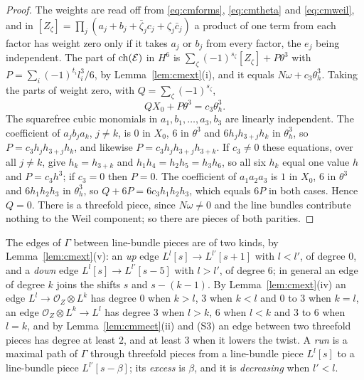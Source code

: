 \begin{proof}
The weights are read off from \eqref{eq:cmforms}, \eqref{eq:cmtheta} and \eqref{eq:cmweil}, and in $[Z_{\zeta}]=\prod_{j}(a_{j}+b_{j}+\bar\zeta_{j}c_{j}+\zeta_{j}\bar c_{j})$ a product of one term from each factor has weight zero only if it takes $a_{j}$ or $b_{j}$ from every factor, the $e_{j}$ being independent. The part of $\mathrm{ch}(\mathcal{E})$ in $H^{6}$ is $\sum_{\zeta}(-1)^{s_{\zeta}}[Z_{\zeta}]+P\theta^{3}$ with $P=\sum_{i}(-1)^{t_{i}}l_{i}^{3}/6$, by Lemma~\ref{lem:cmext}(i), and it equals $N\omega+c_{3}\theta_{h}^{3}$. Taking the parts of weight zero, with $Q=\sum_{\zeta}(-1)^{s_{\zeta}}$,
\[
QX_{0}+P\theta^{3}=c_{3}\theta_{h}^{3}.
\]
The squarefree cubic monomials in $a_{1},b_{1},\dots,a_{3},b_{3}$ are linearly independent. The coefficient of $a_{j}b_{j}a_{k}$, $j\ne k$, is $0$ in $X_{0}$, $6$ in $\theta^{3}$ and $6h_{j}h_{3+j}h_{k}$ in $\theta_{h}^{3}$, so $P=c_{3}h_{j}h_{3+j}h_{k}$, and likewise $P=c_{3}h_{j}h_{3+j}h_{3+k}$. If $c_{3}\ne0$ these equations, over all $j\ne k$, give $h_{k}=h_{3+k}$ and $h_{1}h_{4}=h_{2}h_{5}=h_{3}h_{6}$, so all six $h_{k}$ equal one value $h$ and $P=c_{3}h^{3}$; if $c_{3}=0$ then $P=0$. The coefficient of $a_{1}a_{2}a_{3}$ is $1$ in $X_{0}$, $6$ in $\theta^{3}$ and $6h_{1}h_{2}h_{3}$ in $\theta_{h}^{3}$, so $Q+6P=6c_{3}h_{1}h_{2}h_{3}$, which equals $6P$ in both cases. Hence $Q=0$. There is a threefold piece, since $N\omega\ne0$ and the line bundles contribute nothing to the Weil component; so there are pieces of both parities.
\end{proof}

The edges of $\Gamma$ between line-bundle pieces are of two kinds, by Lemma~\ref{lem:cmext}(v): an \emph{up} edge $L^{l}[s]\to L^{l'}[s+1]$ with $l<l'$, of degree $0$, and a \emph{down} edge $L^{l}[s]\to L^{l'}[s-5]$ with $l>l'$, of degree $6$; in general an edge of degree $k$ joins the shifts $s$ and $s-(k-1)$. By Lemma~\ref{lem:cmext}(iv) an edge $L^{l}\to\mathcal{O}_{Z}\otimes L^{k}$ has degree $0$ when $k>l$, $3$ when $k<l$ and $0$ to $3$ when $k=l$, an edge $\mathcal{O}_{Z}\otimes L^{k}\to L^{l}$ has degree $3$ when $l>k$, $6$ when $l<k$ and $3$ to $6$ when $l=k$, and by Lemma~\ref{lem:cmmeet}(ii) and (S3) an edge between two threefold pieces has degree at least $2$, and at least $3$ when it lowers the twist. A \emph{run} is a maximal path of $\Gamma$ through threefold pieces from a line-bundle piece $L^{l}[s]$ to a line-bundle piece $L^{l'}[s-\beta]$; its \emph{excess} is $\beta$, and it is \emph{decreasing} when $l'<l$.

